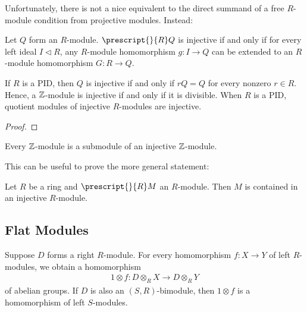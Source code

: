 \documentclass{memoir}
\begin{document}

Unfortunately, there is not a nice equivalent to the direct summand of a free \(R\)-module condition from projective modules. Instead:
\begin{prop}
	Let \(Q\) form an  \(R\)-module. \(\prescript{}{R}Q\) is injective if and only if for every left ideal \(I\triangleleft R\), any \(R\)-module homomorphism \(g:I\to Q\) can be extended to an \(R\)-module homomorphism \(G:R\to Q\).
\end{prop}
If \(R\) is a PID, then \(Q\) is injective if and only if \(rQ = Q\) for every nonzero \(r \in R\). Hence, a \(\mathbb{Z}\)-module is injective if and only if it is divisible. When \(R\) is a PID, quotient modules of injective \(R\)-modules are injective.
\begin{proof}
	
\end{proof}

\begin{cor}
	Every \(\mathbb{Z}\)-module is a submodule of an injective \(\mathbb{Z}\)-module.
\end{cor}
This can be useful to prove the more general statement:
\begin{thm}
	Let \(R\) be a ring and \(\prescript{}{R}M\) an \(R\)-module. Then \(M\) is contained in an injective \(R\)-module.
\end{thm}

\subsection{Flat Modules}
\label{sub:flat_modules}

Suppose \(D\) forms a right \(R\)-module. For every homomorphism \(f:X\to Y\) of left \(R\)-modules, we obtain a homomorphism
\begin{align*}
	1 \otimes f: D \otimes_R X \to D \otimes_R Y
\end{align*}
of abelian groups. If \(D \) is also an \((S,R)\)-bimodule, then \(1 \otimes f\) is a homomorphism of left \(S\)-modules.
\end{document}
